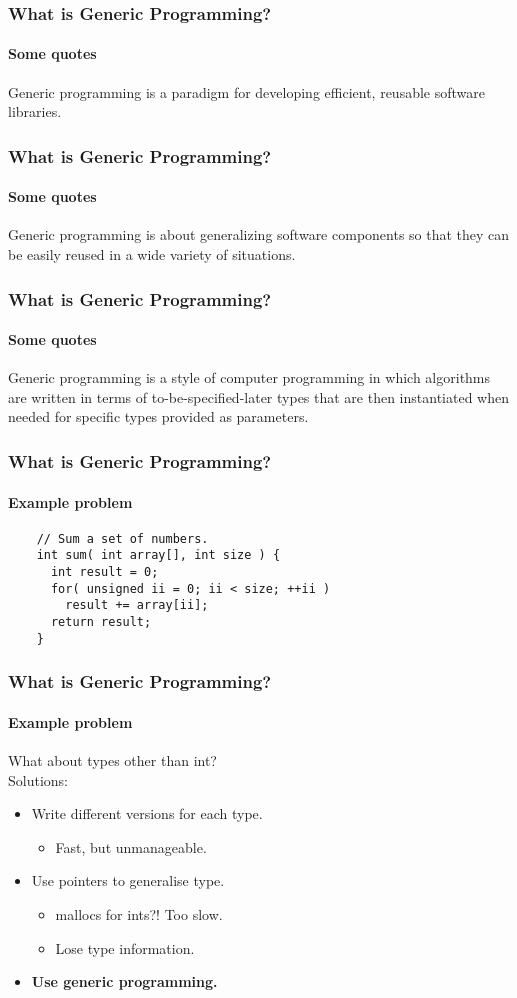 \begin{frame}
  \frametitle{What is Generic Programming?}
  \framesubtitle{Some quotes}
  \begin{block}{}
  {\Large Generic programming is a paradigm for developing efficient, reusable
    software libraries.}
  \end{block}
\end{frame}

\begin{frame}
  \frametitle{What is Generic Programming?}
  \framesubtitle{Some quotes}
  \begin{block}{}
    {\Large Generic programming is about generalizing software components
      so that they can be easily reused in a wide variety of situations.}
  \end{block}
\end{frame}

\begin{frame}
  \frametitle{What is Generic Programming?}
  \framesubtitle{Some quotes}
  \begin{block}{}
    {\Large Generic programming is a style of computer programming
      in which algorithms are written in terms of to-be-specified-later
      types that are then instantiated when needed for specific types
      provided as parameters.}
  \end{block}
\end{frame}

\begin{frame}[fragile]
  \frametitle{What is Generic Programming?}
  \framesubtitle{Example problem}
  \begin{example}
    \begin{lstlisting}
    // Sum a set of numbers.
    int sum( int array[], int size ) {
      int result = 0;
      for( unsigned ii = 0; ii < size; ++ii )
        result += array[ii];
      return result;
    }
    \end{lstlisting}
  \end{example}
\end{frame}

\begin{frame}
  \frametitle{What is Generic Programming?}
  \framesubtitle{Example problem}
  What about types other than int? \\
  Solutions:
  \begin{itemize}
  \item Write different versions for each type.
    \begin{itemize}
    \item Fast, but unmanageable.
    \end{itemize}
  \item Use pointers to generalise type.
    \begin{itemize}
    \item mallocs for ints?! Too slow.
    \item Lose type information.
    \end{itemize}
  \item {\bf Use generic programming.}
  \end{itemize}
\end{frame}

